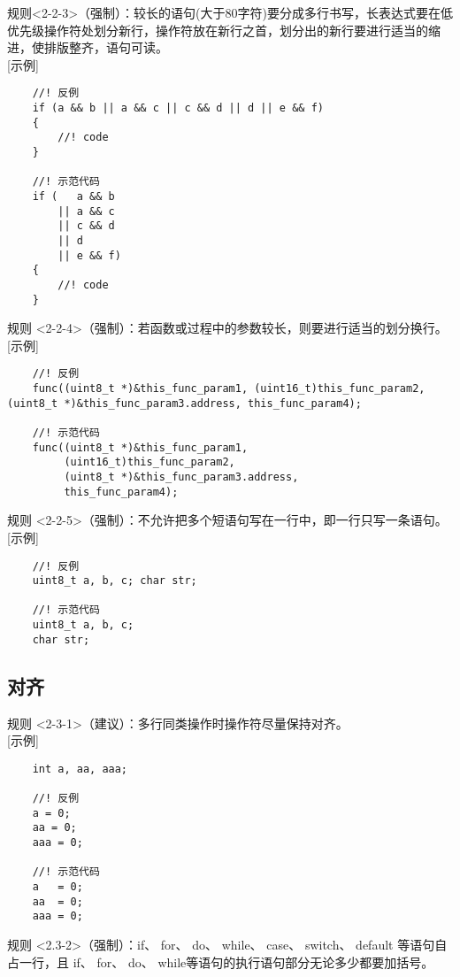 \documentclass[UTF8,a4paper,12pt]{article}
\begin{document}
	规则<2-2-3>（强制）：较长的语句(大于80字符)要分成多行书写，长表达式要在低优先级操作符处划分新行，操作符放在新行之首，划分出的新行要进行适当的缩进，使排版整齐，语句可读。\\
	
	[示例]\\
	\begin{lstlisting}
	//! 反例
	if (a && b || a && c || c && d || d || e && f)
	{
		//! code
	}
	
	//! 示范代码
	if (   a && b 
	    || a && c 
	    || c && d 
	    || d 
	    || e && f)
	{
		//! code
	}
	\end{lstlisting}

	规则 <2-2-4>（强制）：若函数或过程中的参数较长，则要进行适当的划分换行。\\

	[示例]\\
	\begin{lstlisting}
	//! 反例
	func((uint8_t *)&this_func_param1, (uint16_t)this_func_param2, (uint8_t *)&this_func_param3.address, this_func_param4);
	
	//! 示范代码
	func((uint8_t *)&this_func_param1, 
	     (uint16_t)this_func_param2, 
	     (uint8_t *)&this_func_param3.address, 
	     this_func_param4);
	\end{lstlisting}

	规则 <2-2-5>（强制）：不允许把多个短语句写在一行中，即一行只写一条语句。\\
	
	[示例]\\
	\begin{lstlisting}
	//! 反例
	uint8_t a, b, c; char str;
	
	//! 示范代码
	uint8_t a, b, c;
	char str;
	\end{lstlisting}

	\subsection{对齐}
	规则 <2-3-1>（建议）：多行同类操作时操作符尽量保持对齐。\\
	
	[示例]\\
	\begin{lstlisting}
	int a, aa, aaa;
	
	//! 反例
	a = 0;
	aa = 0;
	aaa = 0;
	
	//! 示范代码
	a   = 0;
	aa  = 0;
	aaa = 0;
	\end{lstlisting}
	
	规则 <2.3-2>（强制）：if、 for、 do、 while、 case、 switch、 default 等语句自占一行，且 if、 for、 do、 while等语句的执行语句部分无论多少都要加括号{}。\\
	
\end{document}

